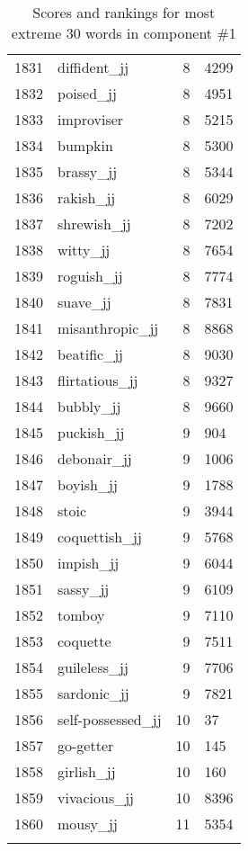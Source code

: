 \begin{longtable}[!htbp]{| rlr@{.}l |}
    1831 & diffident\_jj & 8 & 4299 \\
    1832 & poised\_jj & 8 & 4951 \\
    1833 & improviser & 8 & 5215 \\
    1834 & bumpkin & 8 & 5300 \\
    1835 & brassy\_jj & 8 & 5344 \\
    1836 & rakish\_jj & 8 & 6029 \\
    1837 & shrewish\_jj & 8 & 7202 \\
    1838 & witty\_jj & 8 & 7654 \\
    1839 & roguish\_jj & 8 & 7774 \\
    1840 & suave\_jj & 8 & 7831 \\
    1841 & misanthropic\_jj & 8 & 8868 \\
    1842 & beatific\_jj & 8 & 9030 \\
    1843 & flirtatious\_jj & 8 & 9327 \\
    1844 & bubbly\_jj & 8 & 9660 \\
    1845 & puckish\_jj & 9 & 904 \\
    1846 & debonair\_jj & 9 & 1006 \\
    1847 & boyish\_jj & 9 & 1788 \\
    1848 & stoic & 9 & 3944 \\
    1849 & coquettish\_jj & 9 & 5768 \\
    1850 & impish\_jj & 9 & 6044 \\
    1851 & sassy\_jj & 9 & 6109 \\
    1852 & tomboy & 9 & 7110 \\
    1853 & coquette & 9 & 7511 \\
    1854 & guileless\_jj & 9 & 7706 \\
    1855 & sardonic\_jj & 9 & 7821 \\
    1856 & self-possessed\_jj & 10 & 37 \\
    1857 & go-getter & 10 & 145 \\
    1858 & girlish\_jj & 10 & 160 \\
    1859 & vivacious\_jj & 10 & 8396 \\
    1860 & mousy\_jj & 11 & 5354 \\
    \hline
    \caption{Scores and rankings for most extreme 30 words in component \#1} \\
\end{longtable}
